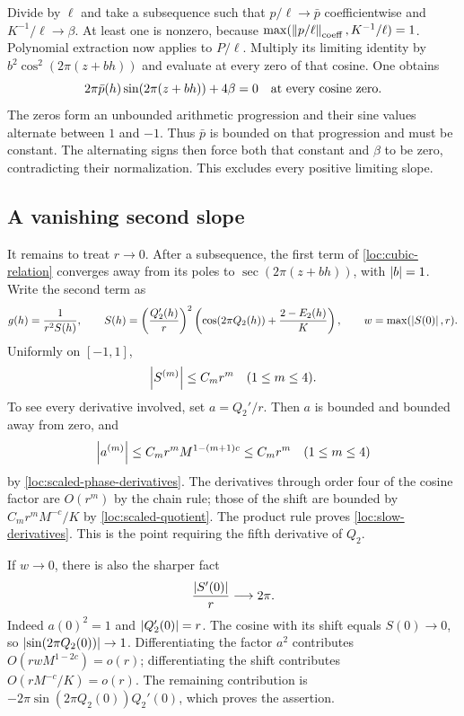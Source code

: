 Divide by $\ell$ and take a subsequence such that
$p/\ell\to\bar p$ coefficientwise and $K^{-1}/\ell\to\beta$.
At least one is nonzero, because
$\max(\left\lVert p/\ell\right\rVert_{\rm coeff},K^{-1}/\ell)=1$.
Polynomial extraction now applies to $P/\ell$. Multiply its limiting
identity by $b^2\cos^2(2\pi(z+bh))$ and evaluate at every zero of
that cosine. One obtains
\begin{equation}
 2\pi\bar p(h)\sin(2\pi(z+bh))+4\beta=0
 \quad\hbox{at every cosine zero.}
 \label{loc:alternating-obstruction}
\end{equation}
The zeros form an unbounded arithmetic progression and their sine
values alternate between $1$ and $-1$. Thus $\bar p$ is bounded on
that progression and must be constant. The alternating signs then
force both that constant and $\beta$ to be zero, contradicting their
normalization. This excludes every positive limiting slope.

\subsection{A vanishing second slope}

It remains to treat $r\to0$. After a subsequence, the first term of
\cref{loc:cubic-relation} converges away from its poles to
$\sec(2\pi(z+bh))$, with $\left\lvert b\right\rvert=1$. Write the second term as
\begin{equation}
 g(h)=\frac1{r^2S(h)},\qquad
 S(h)=\left(\frac{Q_2'(h)}r\right)^2
       \left(\cos(2\pi Q_2(h))+\frac{2-E_2(h)}K\right),
 \qquad w=\max(\left\lvert S(0)\right\rvert,r).
 \label{loc:slow-denominator}
\end{equation}
Uniformly on $[-1,1]$,
\begin{equation}
 \left\lvert S^{(m)}\right\rvert\le C_m r^m\quad(1\le m\le4).
 \label{loc:slow-derivatives}
\end{equation}
To see every derivative involved, set $a=Q_2'/r$. Then $a$ is
bounded and bounded away from zero, and
\[
 \left\lvert a^{(m)}\right\rvert\le C_m r^m M^{1-(m+1)c}\le C_m r^m
 \quad(1\le m\le4)
\]
by \cref{loc:scaled-phase-derivatives}. The derivatives through
order four of the cosine factor are $O(r^m)$ by the chain rule;
those of the shift are bounded by $C_mr^mM^{-c}/K$ by
\cref{loc:scaled-quotient}. The product rule proves
\cref{loc:slow-derivatives}. This is the point requiring the fifth
derivative of $Q_2$.

If $w\to0$, there is also the sharper fact
\begin{equation}
 \frac{\left\lvert S'(0)\right\rvert}r\longrightarrow2\pi.
 \label{loc:slow-nonzero-slope}
\end{equation}
Indeed $a(0)^2=1$ and $\left\lvert Q_2'(0)\right\rvert=r$. The cosine with its shift
equals $S(0)\to0$, so $\left\lvert\sin(2\pi Q_2(0))\right\rvert\to1$.
Differentiating the factor $a^2$ contributes
$O(rwM^{1-2c})=o(r)$; differentiating the shift contributes
$O(rM^{-c}/K)=o(r)$. The remaining contribution is
$-2\pi\sin(2\pi Q_2(0))Q_2'(0)$, which proves the assertion.

